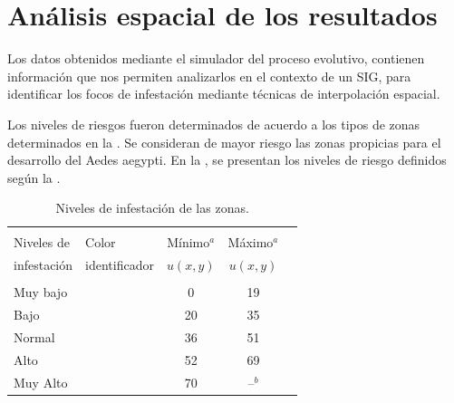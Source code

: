 \section {Análisis espacial de los resultados}

Los datos obtenidos mediante el simulador del proceso evolutivo, contienen información que nos
permiten analizarlos en el contexto de un SIG, para identificar los focos de infestación mediante
técnicas de interpolación espacial.

Los niveles de riesgos fueron determinados de acuerdo a los tipos de zonas determinados en la
. Se consideran de mayor riesgo las zonas propicias para el
desarrollo del Aedes aegypti. En la , se presentan los niveles de
riesgo definidos según la .


\begin{table}[!hptb]
    \begin{minipage}{\textwidth}
\begin{center}
    \caption{\label{tab:niveles-riesgo-zonas} Niveles de infestación de las zonas.}
    \begin{tabular}{p{3cm} l c c c}
        \hline \\
         Niveles de  & Color & Mínimo$^a$ & Máximo$^a$ \\
         infestación & identificador & $u(x,y)$   & $u(x,y)$  \\
        \hline
        \hline\\
        Muy bajo  & \cellcolor{muybajo}& 0  & 19 \\
        Bajo    & \cellcolor{bajo}& 20 & 35 \\
        Normal & \cellcolor{normal}& 36 & 51 \\
        Alto   & \cellcolor{alto}& 52 & 69 \\
        Muy Alto & \cellcolor{muyalto} & 70 & --$^b$\\
    \end{tabular}
\end{center}
    \end{minipage}
\end{table}

